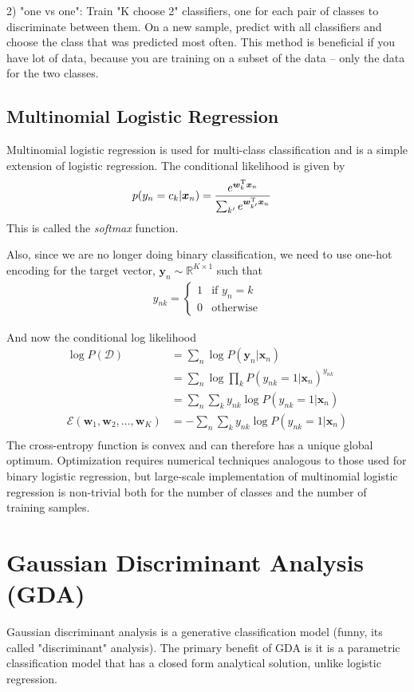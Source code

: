 \documentclass[11pt]{article}
\newcommand{\vct}[1]{\boldsymbol{#1}} %
\newcommand{\T}{^{\textrm T}} %
\newcommand{\ProbOpr}[1]{\mathbb{#1}}
\begin{document}
2) "one vs one": Train "K choose 2" classifiers, one for each pair of classes to discriminate between them. On a new sample, predict with all classifiers and choose the class that was predicted most often. This method is beneficial if you have lot of data, because you are training on a subset of the data -- only the data for the two classes. 


\subsection{Multinomial Logistic Regression}
Multinomial logistic regression is used for multi-class classification and is a simple extension of logistic regression. The conditional likelihood is given by
\begin{align*}
p(y_n = c_k|\vct{x}_n) &= \frac{e^{\vct{w}_k\T\vct{x}_n}}{\sum_{k'} e^{\vct{w}_{k'}\T\vct{x}_n}}
\end{align*}
This is called the {\it softmax} function.

Also, since we are no longer doing binary classification, we need to use one-hot encoding for the target vector, $\vct{y}_n \sim \ProbOpr{R}^{K \times 1}$ such that
\begin{align*}
y_{nk} = \begin{cases} 1 & \text{if } y_n = k \\ 0 & \text{otherwise} \end{cases}
\end{align*}

And now the conditional log likelihood
\begin{align*}
\log P(\mathcal{D}) &= \sum_n \log P(\vct{y}_n|\vct{x}_n)\\
&= \sum_n \log \prod_k P(y_{nk}=1|\vct{x}_n)^{y_{nk}}\\
&= \sum_n \sum_k y_{nk} \log P(y_{nk}=1|\vct{x}_n)\\
\mathcal{E}(\vct{w}_1, \vct{w}_2, \hdots, \vct{w}_K) &= -\sum_n \sum_k y_{nk} \log P(y_{nk}=1|\vct{x}_n)\\
\end{align*}
The cross-entropy function is convex and can therefore has a unique global optimum. Optimization requires numerical techniques analogous to those used for binary logistic regression, but large-scale implementation of multinomial logistic regression is non-trivial both for the number of classes and the number of training samples. 

\section{Gaussian Discriminant Analysis (GDA)}
Gaussian discriminant analysis is a generative classification model (funny, its called "discriminant" analysis). The primary benefit of GDA is it is a parametric	classification model that has a closed form analytical solution, unlike logistic regression.	
\end{document}
